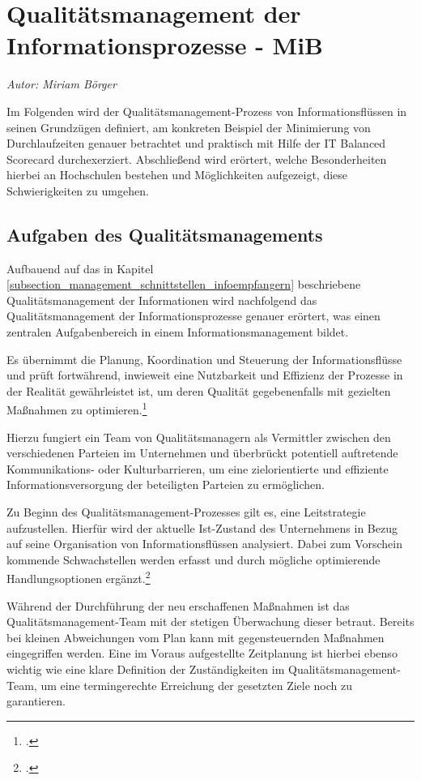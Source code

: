 \section{Qualitätsmanagement der Informationsprozesse - MiB}
\textit{Autor: Miriam Börger}


Im Folgenden wird der Qualitätsmanagement-Prozess von Informationsflüssen in seinen Grundzügen definiert, 
am konkreten Beispiel der Minimierung von Durchlaufzeiten genauer betrachtet und 
praktisch mit Hilfe der IT Balanced Scorecard durchexerziert. 
Abschließend wird erörtert, welche Besonderheiten hierbei an Hochschulen bestehen 
und Möglichkeiten aufgezeigt, diese Schwierigkeiten zu umgehen.

\subsection{Aufgaben des Qualitätsmanagements}
Aufbauend auf das in Kapitel \ref{subsection_management_schnittstellen_infoempfangern} beschriebene Qualitätsmanagement der Informationen 
wird nachfolgend das Qualitätsmanagement der Informationsprozesse genauer erörtert, was 
einen zentralen Aufgabenbereich in einem Informationsmanagement bildet.

Es übernimmt die Planung, Koordination und Steuerung der Informationsflüsse und prüft fortwährend, inwieweit eine Nutzbarkeit und Effizienz der Prozesse in der Realität gewährleistet ist, um deren Qualität gegebenenfalls mit gezielten Maßnahmen zu optimieren.\footcite[34 ff.]{schroder_wertorientiertes_2005}

Hierzu fungiert ein Team von Qualitätsmanagern als Vermittler zwischen den verschiedenen Parteien im Unternehmen und überbrückt potentiell auftretende Kommunikations- oder Kulturbarrieren, um eine zielorientierte und effiziente Informationsversorgung der beteiligten Parteien zu ermöglichen.

Zu Beginn des Qualitätsmanagement-Prozesses gilt es, eine Leitstrategie aufzustellen. Hierfür wird der aktuelle Ist-Zustand des Unternehmens in Bezug auf seine Organisation von Informationsflüssen analysiert. Dabei zum Vorschein kommende Schwachstellen werden erfasst und durch mögliche optimierende Handlungsoptionen ergänzt.\footcite{helmke_management_2013}

Während der Durchführung der neu erschaffenen Maßnahmen ist das 
Qualitätsmanagement-Team mit der stetigen Überwachung dieser betraut. 
Bereits bei kleinen Abweichungen vom Plan kann mit gegensteuernden Maßnahmen 
eingegriffen werden. Eine im Voraus aufgestellte Zeitplanung ist hierbei ebenso wichtig wie 
eine klare Definition der Zuständigkeiten im Qualitätsmanagement-Team, um eine 
termingerechte Erreichung der gesetzten Ziele noch zu garantieren.

